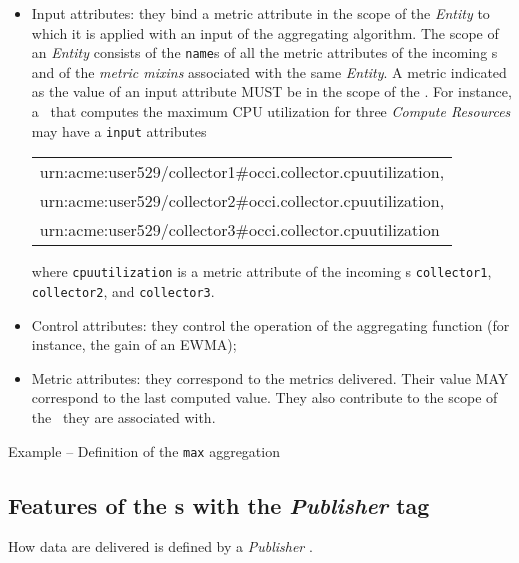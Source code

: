 \documentclass[12pt]{article}  %
\begin{document}
\begin{itemize}

\item Input attributes: they bind a metric attribute in the scope of the {\em Entity} to which it is applied with an input of the aggregating algorithm. The scope of an {\em Entity} consists of the {\tt name}s of all the metric attributes of the incoming \coll s and of the {\em metric mixins} associated with the same {\em Entity}. A metric indicated as the value of an input attribute MUST be in the scope of the \sens . For instance, a \sens\ that computes the maximum CPU utilization for three {\em Compute Resources} may have a {\tt input} attributes 
\begin{tabular}{l}
urn:acme:user529/collector1\#occi.collector.cpuutilization, \\
urn:acme:user529/collector2\#occi.collector.cpuutilization, \\
urn:acme:user529/collector3\#occi.collector.cpuutilization 
\end{tabular}
where \verb&cpuutilization& is a metric attribute of the incoming \coll s {\tt collector1}, {\tt collector2}, and {\tt collector3}.

\item Control attributes: they control the operation of the aggregating function (for instance, the gain of an EWMA);

\item Metric attributes: they correspond to the metrics delivered. Their value MAY correspond to the last computed value. They also contribute to the scope of the \sens\ they are associated with.
\end{itemize}

\begin{table}
\caption{Example -- Definition of the {\tt \small max} aggregation \mi } 
\end{table}



\subsection{Features of the \mi s with the {\em Publisher} tag \label{sec:Publisher}}

How data are delivered is defined by a {\em Publisher} \mi .
\end{document}
